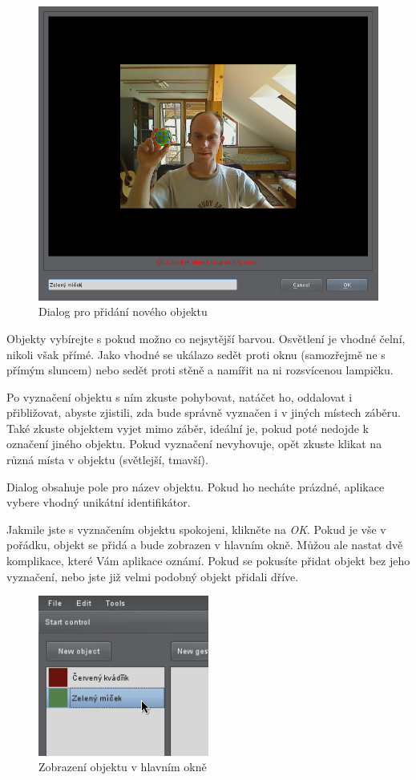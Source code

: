 \begin{figure}[h]
\centering
\includegraphics[width=\textwidth]{newobject.png}
\caption{Dialog pro přidání nového objektu}
\label{fig:newobject}
\end{figure}

Objekty vybírejte s pokud možno co nejsytější barvou. Osvětlení je vhodné
čelní, nikoli však přímé. Jako vhodné se ukálazo sedět proti oknu (samozřejmě
ne s přímým sluncem) nebo sedět proti stěně a namířit na ni rozsvícenou
lampičku.

Po vyznačení objektu s ním zkuste pohybovat, natáčet ho, oddalovat i
přibližovat, abyste zjistili, zda bude správně vyznačen i v jiných místech
záběru. Také zkuste objektem vyjet mimo záběr, ideální je, pokud poté nedojde k
označení jiného objektu. Pokud vyznačení nevyhovuje, opět zkuste klikat na
různá místa v objektu (světlejší, tmavší).

Dialog obsahuje pole pro název objektu. Pokud ho necháte prázdné, aplikace
vybere vhodný unikátní identifikátor.

Jakmile jste s vyznačením objektu spokojeni, klikněte na \emph{OK}. Pokud je
vše v pořádku, objekt se přidá a bude zobrazen v hlavním okně. Můžou ale
nastat dvě komplikace, které Vám aplikace oznámí. Pokud se pokusíte přidat
objekt bez jeho vyznačení, nebo jste již velmi podobný objekt přidali dříve.

\begin{figure}[h]
\centering
\includegraphics[width=0.5\textwidth]{object.png}
\caption{Zobrazení objektu v hlavním okně}
\end{figure}

